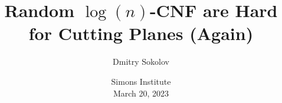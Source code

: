 

\titlegraphic{
    
}


\title[]{
    Random $\log(n)$-CNF are Hard for Cutting Planes (Again)
}

\author{
    Dmitry Sokolov
}  


\date{
    Simons Institute\\
    March 20, 2023
}






    \maketitle

    
    
    

